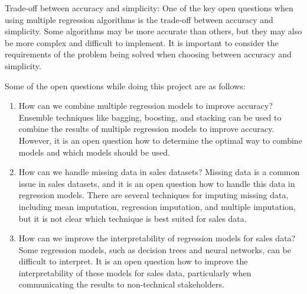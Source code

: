 Trade-off between accuracy and simplicity: One of the key open questions when using multiple regression algorithms is the trade-off between accuracy and simplicity. Some algorithms may be more accurate than others, but they may also be more complex and difficult to implement. It is important to consider the requirements of the problem being solved when choosing between accuracy and simplicity.

Some of the open questions while doing this project are as follows:

\begin{enumerate}
	\item How can we combine multiple regression models to improve accuracy? Ensemble techniques like bagging, boosting, and stacking can be used to combine the results of multiple regression models to improve accuracy. However, it is an open question how to determine the optimal way to combine models and which models should be used.
	
	\item How can we handle missing data in sales datasets? Missing data is a common issue in sales datasets, and it is an open question how to handle this data in regression models. There are several techniques for imputing missing data, including mean imputation, regression imputation, and multiple imputation, but it is not clear which technique is best suited for sales data.
	
	\item How can we improve the interpretability of regression models for sales data? Some regression models, such as decision trees and neural networks, can be difficult to interpret. It is an open question how to improve the interpretability of these models for sales data, particularly when communicating the results to non-technical stakeholders.

\end{enumerate}
